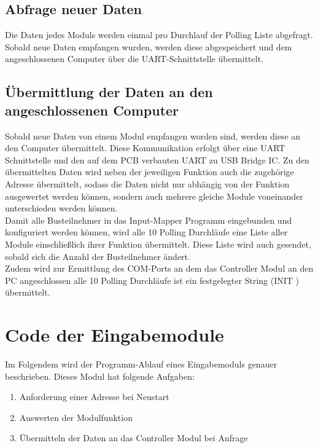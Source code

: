 \subsection{Abfrage neuer Daten}
Die Daten jedes Moduls werden einmal pro Durchlauf der Polling Liste abgefragt. Sobald neue Daten empfangen wurden, werden diese abgespeichert und dem angeschlossenen Computer über die UART-Schnittstelle übermittelt.\\



\subsection{Übermittlung der Daten an den angeschlossenen Computer}
Sobald neue Daten von einem Modul empfangen worden sind, werden diese an den Computer übermittelt. Diese Kommunikation erfolgt über eine UART Schnittstelle und den auf dem PCB verbauten UART zu USB Bridge IC. Zu den übermittelten Daten wird neben der jeweiligen Funktion auch die zugehörige Adresse übermittelt, sodass die Daten nicht nur abhängig von der Funktion ausgewertet werden können, sondern auch mehrere gleiche Module voneinander unterschieden werden können.\\
Damit alle Busteilnehmer in das Input-Mapper Programm eingebunden und konfiguriert werden können, wird alle 10 Polling Durchläufe eine Liste aller Module einschließlich ihrer Funktion übermittelt. Diese Liste wird auch gesendet, sobald sich die Anzahl der Busteilnehmer ändert.\\
Zudem wird zur Ermittlung des COM-Ports an dem das Controller Modul an den PC angeschlossen alle 10 Polling Durchläufe ist ein festgelegter String (\glqq INIT
\grqq) übermittelt.


\section{Code der Eingabemodule}
\label{Code der Eingabemodule}
Im Folgendem wird der Programm-Ablauf eines Eingabemoduls genauer beschrieben. Dieses Modul hat folgende Aufgaben:
\begin{enumerate}
    \item Anforderung einer Adresse bei Neustart
    \item Auswerten der Modulfunktion
    \item Übermitteln der Daten an das Controller Modul bei Anfrage
\end{enumerate}

